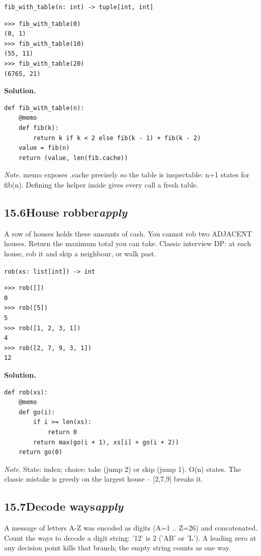 \documentclass[10pt,letterpaper]{book}
\begin{document}
\noindent\texttt{fib\_with\_table(n: int) -> tuple[int, int]}
\begin{lstlisting}[style=ex]
>>> fib_with_table(0)
(0, 1)
>>> fib_with_table(10)
(55, 11)
>>> fib_with_table(20)
(6765, 21)
\end{lstlisting}
\noindent\textbf{Solution.}
\begin{lstlisting}[style=code]
def fib_with_table(n):
    @memo
    def fib(k):
        return k if k < 2 else fib(k - 1) + fib(k - 2)
    value = fib(n)
    return (value, len(fib.cache))
\end{lstlisting}
\noindent\textit{Note.} memo exposes .cache precisely so the table is inspectable: n+1 states for fib(n). Defining the helper inside gives every call a fresh table.

\subsection*{15.6\quad House robber\hfill\textnormal{\textit{apply}}}
A row of houses holds these amounts of cash. You cannot rob two ADJACENT houses. Return the maximum total you can take. Classic interview DP: at each house, rob it and skip a neighbour, or walk past.

\noindent\texttt{rob(xs: list[int]) -> int}
\begin{lstlisting}[style=ex]
>>> rob([])
0
>>> rob([5])
5
>>> rob([1, 2, 3, 1])
4
>>> rob([2, 7, 9, 3, 1])
12
\end{lstlisting}
\noindent\textbf{Solution.}
\begin{lstlisting}[style=code]
def rob(xs):
    @memo
    def go(i):
        if i >= len(xs):
            return 0
        return max(go(i + 1), xs[i] + go(i + 2))
    return go(0)
\end{lstlisting}
\noindent\textit{Note.} State: index; choice: take (jump 2) or skip (jump 1). O(n) states. The classic mistake is greedy on the largest house -- [2,7,9] breaks it.

\subsection*{15.7\quad Decode ways\hfill\textnormal{\textit{apply}}}
A message of letters A-Z was encoded as digits (A=1 .. Z=26) and concatenated. Count the ways to decode a digit string: '12' is 2 ('AB' or 'L'). A leading zero at any decision point kills that branch; the empty string counts as one way.
\end{document}
